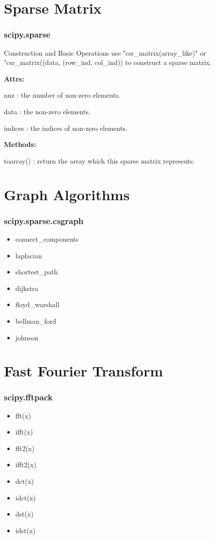 \documentclass[english, nochinese]{beamer}
\begin{document}
\section{Sparse Matrix}
\begin{frame}
\frametitle{scipy.sparse}
\begin{block}{Construction and Basic Operations}
use "csr\_matrix(array\_like)" or "csr\_matrix((data, (row\_ind, col\_ind)) to construct a sparse matrix.

\textbf{Attrs:}

nnz : the number of non-zero elements.

data : the non-zero elements.

indices : the indices of non-zero elements.


\textbf{Methods:}

toarray() : return the array which this sparse matrix represents.



\end{block}
\end{frame}



\section{Graph Algorithms}
\begin{frame}
\frametitle{scipy.sparse.csgraph}
\begin{itemize}
\item connect\_components
\item laplacian
\item shortest\_path
\item dijkstra
\item floyd\_warshall
\item bellman\_ford
\item johnson

\end{itemize}
\end{frame}
\section{Fast Fourier Transform}
\begin{frame}
\frametitle{scipy.fftpack}
\begin{itemize}
\item fft(x)
\item ifft(x)
\item fft2(x)
\item ifft2(x)
\item dct(x)
\item idct(x)
\item dst(x)
\item idst(x)
\end{itemize}
\end{frame}
\end{document}
